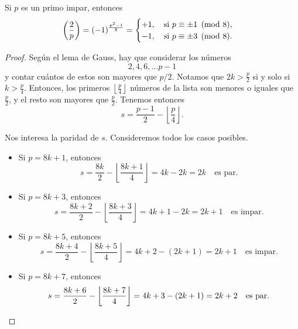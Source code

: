 \documentclass{article}
\theoremstyle{plain}
\begin{document}
\begin{proposicion}
  Si $p$ es un primo impar, entonces
  $$\left(\frac{2}{p}\right) = (-1)^{\frac{p^2-1}{8}} = \begin{cases}
    +1, \quad \text{si }p \equiv \pm 1 \pmod{8},\\
    -1, \quad \text{si }p \equiv \pm 3 \pmod{8}.
  \end{cases}$$

  \begin{proof}
    Según el lema de Gauss, hay que considerar los números
    $$2, 4, 6, \ldots p-1$$
    y contar cuántos de estos son mayores que $p/2$. Notamos que
    $2k > \frac{p}{2}$ si y solo si $k > \frac{p}{4}$. Entonces, los primeros
    $\left\lfloor\frac{p}{4}\right\rfloor$ números de la lista son menores o
    iguales que $\frac{p}{2}$, y el resto son mayores que $\frac{p}{2}$. Tenemos
    entonces
    $$s = \frac{p-1}{2} - \left\lfloor\frac{p}{4}\right\rfloor.$$

    Nos interesa la paridad de $s$. Consideremos todos los casos posibles.

    \begin{itemize}
    \item Si $p = 8k + 1$, entonces
      $$s = \frac{8k}{2} - \left\lfloor\frac{8k+1}{4}\right\rfloor = 4k - 2k = 2k \quad \text{es par}.$$

    \item Si $p = 8k + 3$, entonces
      $$s = \frac{8k+2}{2} - \left\lfloor\frac{8k+3}{4}\right\rfloor = 4k + 1 - 2k = 2k + 1 \quad \text{es impar}.$$

    \item Si $p = 8k + 5$, entonces
      $$s = \frac{8k+4}{2} - \left\lfloor\frac{8k+5}{4}\right\rfloor = 4k + 2 - (2k+1) = 2k + 1 \quad \text{es impar}.$$

    \item Si $p = 8k + 7$, entonces
      \[ s = \frac{8k+6}{2} - \left\lfloor\frac{8k+7}{4}\right\rfloor =
        4k + 3 - (2k+1) = 2k + 2 \quad \text{es par}. \qedhere \]
    \end{itemize}
  \end{proof}
\end{proposicion}
\end{document}
